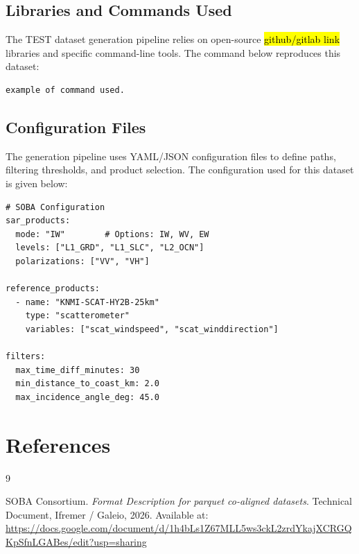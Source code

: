 \documentclass[11pt,a4paper]{article}
\begin{document}
\subsection{Libraries and Commands Used}
The TEST dataset generation pipeline relies on open-source \hl{github/gitlab link} libraries and specific command-line tools. The command below reproduces this dataset:

\begin{lstlisting}[caption={Example of bash cmd for data generation.}, label={lst:code}]
example of command used.
\end{lstlisting}

\subsection{Configuration Files}
The generation pipeline uses YAML/JSON configuration files to define paths, filtering thresholds, and product selection. The configuration used for this dataset is given below:

\begin{lstlisting}[caption={Example of configuration file \hl{to be modified}  (config.yaml).}, label={lst:config}]
# SOBA Configuration
sar_products:
  mode: "IW"        # Options: IW, WV, EW
  levels: ["L1_GRD", "L1_SLC", "L2_OCN"]
  polarizations: ["VV", "VH"]

reference_products:
  - name: "KNMI-SCAT-HY2B-25km"
    type: "scatterometer"
    variables: ["scat_windspeed", "scat_winddirection"]
    
filters:
  max_time_diff_minutes: 30
  min_distance_to_coast_km: 2.0
  max_incidence_angle_deg: 45.0
\end{lstlisting}

\newpage
\newpage
\section*{References}

\begin{thebibliography}{9}

SOBA Consortium.
\textit{Format Description for parquet co-aligned datasets}.
Technical Document, Ifremer / Galeio, 2026.
Available at: \url{https://docs.google.com/document/d/1h4bLs1Z67MLL5ws3ckL2zrdYkajXCRGQKpSfnLGABes/edit?usp=sharing}

\end{thebibliography}
\end{document}
